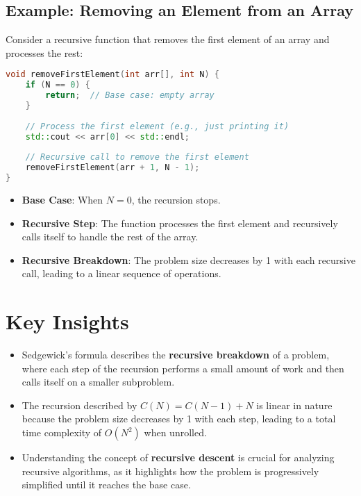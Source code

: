 \documentclass{article}
\begin{document}
\subsection{Example: Removing an Element from an Array}

Consider a recursive function that removes the first element of an array and processes the rest:

\begin{lstlisting}[language=C++, caption=Removing the First Element using Linear Recursion]
void removeFirstElement(int arr[], int N) {
    if (N == 0) {
        return;  // Base case: empty array
    }
    
    // Process the first element (e.g., just printing it)
    std::cout << arr[0] << std::endl;
    
    // Recursive call to remove the first element
    removeFirstElement(arr + 1, N - 1);
}
\end{lstlisting}

\begin{itemize}
    \item \textbf{Base Case}: When $N = 0$, the recursion stops.
    \item \textbf{Recursive Step}: The function processes the first element and recursively calls itself to handle the rest of the array.
    \item \textbf{Recursive Breakdown}: The problem size decreases by 1 with each recursive call, leading to a linear sequence of operations.
\end{itemize}

\section{Key Insights}

\begin{itemize}
    \item Sedgewick's formula describes the \textbf{recursive breakdown} of a problem, where each step of the recursion performs a small amount of work and then calls itself on a smaller subproblem.
    \item The recursion described by $C(N) = C(N-1) + N$ is linear in nature because the problem size decreases by 1 with each step, leading to a total time complexity of $O(N^2)$ when unrolled.
    \item Understanding the concept of \textbf{recursive descent} is crucial for analyzing recursive algorithms, as it highlights how the problem is progressively simplified until it reaches the base case.
\end{itemize}
\end{document}
